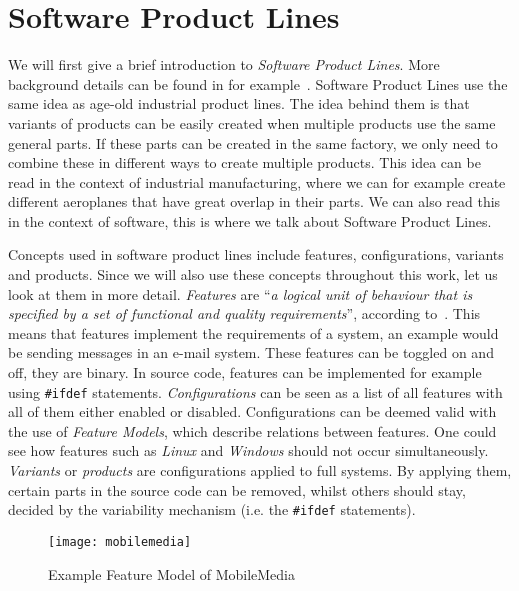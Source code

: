 \section{Software Product Lines}\label{sec:spl}
We will first give a brief introduction to \emph{Software Product Lines}.
More background details can be found in for 
example~\cite{van2001notion, apel2013software, bosch2000design}.
Software Product Lines use the same idea as age-old industrial product lines.
The idea behind them is that variants of products can be easily created when 
multiple products use the same general parts. If these parts can be created
in the same factory, we only need to combine these in different ways to create
multiple products. This idea can be read in the context of industrial
manufacturing, where we can for example create different aeroplanes that have
great overlap in their parts. We can also read this in the context of software,
this is where we talk about Software Product Lines.

Concepts used in software product lines include features, configurations,
variants and products. Since we will also use these concepts throughout this
work, let us look at them in more detail. \emph{Features} are ``\emph{a logical
unit of behaviour that is specified by a set of functional and quality
requirements}'', according to~\cite{bosch2000design}. This means that features
implement the requirements of a system, an example would be sending messages in
an e-mail system. These features can be toggled on and off, they are binary. In
source code, features can be implemented for example using \texttt{\#ifdef}
statements. \emph{Configurations} can be seen as a list of all features with
all of them either enabled or disabled. Configurations can be deemed valid with
the use of \emph{Feature Models}, which describe relations between features.
One could see how features such as \emph{Linux} and \emph{Windows} should not
occur simultaneously. \emph{Variants} or \emph{products} are configurations
applied to full systems. By applying them, certain parts in the source code can
be removed, whilst others should stay, decided by the variability mechanism
(i.e. the \texttt{\#ifdef} statements).

\begin{figure}
    \texttt{[image: mobilemedia]}
    \caption{Example Feature Model of MobileMedia~\cite{horcas2022breakit}}
    \label{fig:example:mobilemedia}
\end{figure}

